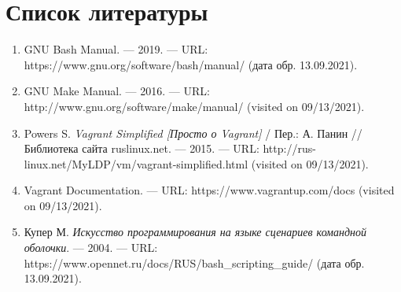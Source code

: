 \documentclass[
  12pt,
  a4paper,
  DIV=11,
  numbers=noendperiod]{scrreprt}
\begin{document}
\chapter{Список
литературы}\label{ux441ux43fux438ux441ux43eux43a-ux43bux438ux442ux435ux440ux430ux442ux443ux440ux44b}

\begin{enumerate}
\def\labelenumi{\arabic{enumi}.}
\item
  GNU Bash Manual. --- 2019. --- URL:
  https://www.gnu.org/software/bash/manual/ (дата обр. 13.09.2021).
\item
  GNU Make Manual. --- 2016. --- URL:
  http://www.gnu.org/software/make/manual/ (visited on 09/13/2021).
\item
  Powers S. \emph{Vagrant Simplified {[}Просто о Vagrant{]}} / Пер.: А.
  Панин // Библиотека сайта ruslinux.net. --- 2015. --- URL:
  http://rus-linux.net/MyLDP/vm/vagrant-simplified.html (visited on
  09/13/2021).
\item
  Vagrant Documentation. --- URL: https://www.vagrantup.com/docs
  (visited on 09/13/2021).
\item
  Купер М. \emph{Искусство программирования на языке сценариев командной
  оболочки}. --- 2004. --- URL:
  https://www.opennet.ru/docs/RUS/bash\_scripting\_guide/ (дата обр.
  13.09.2021).
\end{enumerate}


\printbibliography
\end{document}
